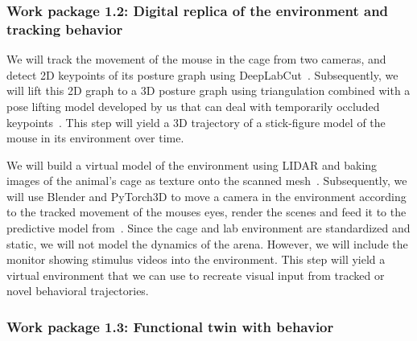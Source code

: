 \documentclass[B2,COG]{ercgrant}
\begin{document}
\subsubsection{Work package 1.2: Digital replica of the environment and tracking behavior\hfill{}}



We will track the movement of the mouse in the cage from two cameras, and detect 2D keypoints of its posture graph using DeepLabCut~\parencite{Mathis2018-lk}. 
Subsequently, we will lift this 2D graph to a 3D posture graph using triangulation combined with a pose lifting model developed by us that can deal with temporarily occluded keypoints~\parencite{Pierzchlewicz2022-tq}. 
This step will yield a 3D trajectory of a stick-figure model of the mouse in its environment over time. 



We will build a virtual model of the environment using LIDAR and baking images of the animal's cage as texture onto the scanned mesh~\parencite[similar as in][]{Holmgren2021-jv}.
Subsequently, we will use Blender and PyTorch3D to move a camera in the environment according to the tracked movement of the mouses eyes, render the scenes and feed it to the predictive model from~.
Since the cage and lab environment are standardized and static, we will not model the dynamics of the arena. 
However, we will include the monitor showing stimulus videos into the environment. 
This step will yield a virtual environment that we can use to recreate visual input from tracked or novel behavioral trajectories.


\subsubsection{Work package 1.3: Functional twin with behavior\hfill{}}
\end{document}
